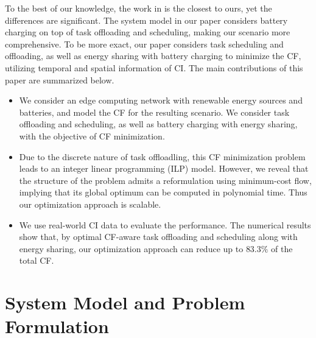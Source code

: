 \documentclass[conference, 10pt, ﬁnal, letterpaper, twocolumn]{IEEEtran}
\begin{document}
To the best of our knowledge, the work in \cite{yang2022carbon} is the closest to ours, yet the differences are significant. The system model in our paper considers battery charging on top of task offloading and scheduling, making our scenario more comprehensive. To be more exact, our paper considers task scheduling and offloading, as well as energy sharing with battery charging to minimize the CF, utilizing temporal and spatial information of CI. The main contributions of this paper are summarized below.
\begin{itemize}
    \item We consider an edge computing network with renewable energy sources and batteries, and model the CF for the resulting scenario. We consider task offloading and scheduling, as well as battery charging with energy sharing, with the objective of CF minimization. 
    \item Due to the discrete nature of task offloadling, this CF minimization problem leads to an integer linear programming (ILP) model. However, we reveal that the structure of the problem admits a reformulation using minimum-cost flow, implying that its global optimum can be computed in polynomial time. Thus our optimization approach is scalable. 
    \item We use real-world CI data to evaluate the performance. The numerical results show that, by optimal CF-aware task offloading and scheduling along with energy sharing, our optimization approach can reduce up to $83.3\%$ of the total CF.
\end{itemize}

\section{System Model and Problem Formulation}


\end{document}
